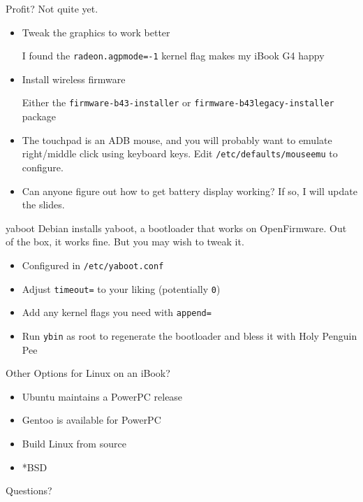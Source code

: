 \documentclass{lug}
\begin{document}
\begin{frame}{Profit? Not quite yet.}
    \begin{itemize}[<+->]
        \setlength\itemsep{1em}
        \item Tweak the graphics to work better\par
            {\small I found the \texttt{radeon.agpmode=-1} kernel flag makes my
            iBook G4 happy}
        \item Install wireless firmware\par
            {\small Either the \texttt{firmware-b43-installer} or
            \texttt{firmware-b43legacy-installer} package}
        \item The touchpad is an ADB mouse, and you will probably want to
            emulate right/middle click using keyboard keys. Edit
            \texttt{/etc/defaults/mouseemu} to configure.
        \item Can anyone figure out how to get battery display working? If so,
            I will update the slides.
    \end{itemize}
\end{frame}

\begin{frame}{yaboot}
    Debian installs yaboot, a bootloader that works on OpenFirmware. Out of the
    box, it works fine. But you may wish to tweak it.
    \pause
    \begin{itemize}[<+->]
        \item Configured in \texttt{/etc/yaboot.conf}
        \item Adjust \texttt{timeout=} to your liking (potentially \texttt{0})
        \item Add any kernel flags you need with \texttt{append=}
        \item Run \texttt{ybin} as root to regenerate the bootloader and bless
            it with Holy Penguin Pee
    \end{itemize}
\end{frame}

\begin{frame}{Other Options for Linux on an iBook?}
    \begin{itemize}[<+->]
        \item Ubuntu maintains a PowerPC release
        \item Gentoo is available for PowerPC
        \item Build Linux from source
        \item *BSD
    \end{itemize}
\end{frame}

\begin{frame}
    \centering
    \Huge
    Questions?
\end{frame}
\end{document}
